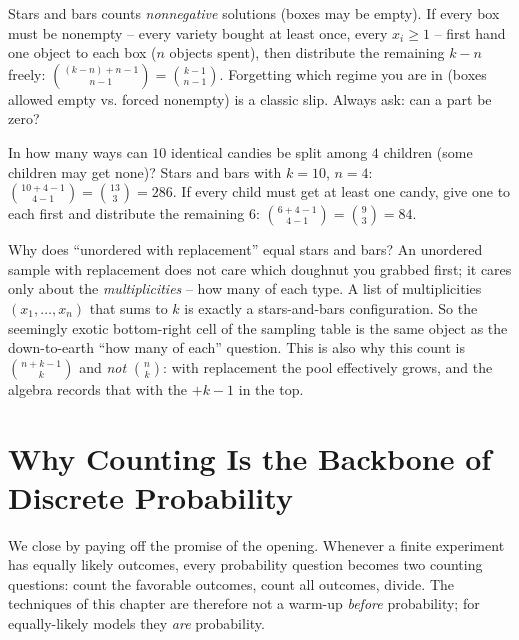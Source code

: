 \begin{trapbox}
Stars and bars counts \emph{nonnegative} solutions (boxes may be empty). If every box must
be nonempty -- every variety bought at least once, every $x_i \ge 1$ -- first hand one
object to each box ($n$ objects spent), then distribute the remaining $k - n$ freely:
$\binom{(k-n)+n-1}{n-1} = \binom{k-1}{n-1}$. Forgetting which regime you are in (boxes
allowed empty vs. forced nonempty) is a classic slip. Always ask: can a part be zero?
\end{trapbox}

\begin{example}
\label{ch2:ex-gifts}
In how many ways can $10$ identical candies be split among $4$ children (some children may
get none)? Stars and bars with $k=10$, $n=4$: $\binom{10+4-1}{4-1} = \binom{13}{3} = 286$.
If every child must get at least one candy, give one to each first and distribute the
remaining $6$: $\binom{6+4-1}{4-1} = \binom{9}{3} = 84$.
\end{example}

\begin{happeningbox}
Why does ``unordered with replacement'' equal stars and bars? An unordered sample with
replacement does not care which doughnut you grabbed first; it cares only about the
\emph{multiplicities} -- how many of each type. A list of multiplicities $(x_1,\dots,x_n)$
that sums to $k$ is exactly a stars-and-bars configuration. So the seemingly exotic
bottom-right cell of the sampling table is the same object as the down-to-earth ``how many
of each'' question. This is also why this count is $\binom{n+k-1}{k}$ and \emph{not}
$\binom{n}{k}$: with replacement the pool effectively grows, and the algebra records that
with the $+k-1$ in the top.
\end{happeningbox}

\section{Why Counting Is the Backbone of Discrete Probability}
\label{ch2:backbone}

We close by paying off the promise of the opening. Whenever a finite experiment has equally
likely outcomes, every probability question becomes two counting questions: count the
favorable outcomes, count all outcomes, divide. The techniques of this chapter are
therefore not a warm-up \emph{before} probability; for equally-likely models they \emph{are}
probability.

